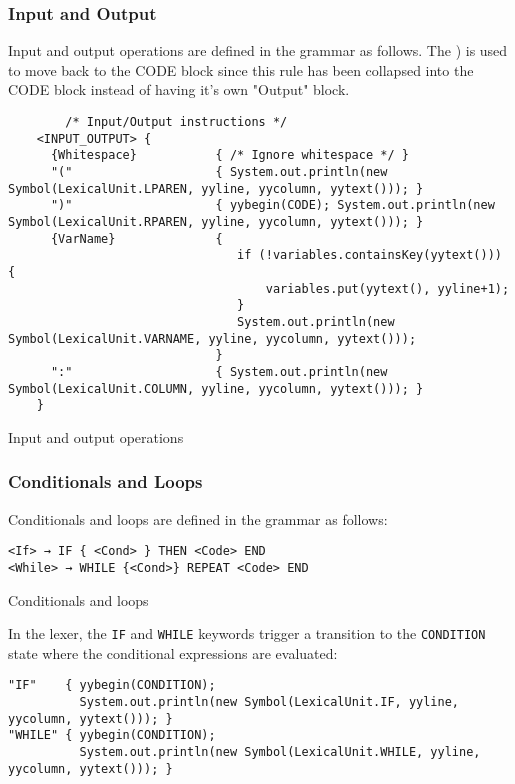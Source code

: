 	\subsubsection{Input and Output}
	Input and output operations are defined in the grammar as follows.
	The ) is used to move back to the CODE block since this rule has been collapsed into the CODE block instead of having it's own "Output" block.\\
	\begin{verbatim}
		/* Input/Output instructions */
	<INPUT_OUTPUT> {
	  {Whitespace}           { /* Ignore whitespace */ }
	  "("                    { System.out.println(new Symbol(LexicalUnit.LPAREN, yyline, yycolumn, yytext())); }
	  ")"                    { yybegin(CODE); System.out.println(new Symbol(LexicalUnit.RPAREN, yyline, yycolumn, yytext())); }
	  {VarName}              {
								if (!variables.containsKey(yytext())) {
									variables.put(yytext(), yyline+1);
								}
								System.out.println(new Symbol(LexicalUnit.VARNAME, yyline, yycolumn, yytext()));
							 }
	  ":"                    { System.out.println(new Symbol(LexicalUnit.COLUMN, yyline, yycolumn, yytext())); }
	}
	\end{verbatim}

    \begin{table}[h]
		\centering
		\caption{Input and output operations}
	\end{table}

	\subsubsection{Conditionals and Loops}
	Conditionals and loops are defined in the grammar as follows:

	\begin{verbatim}
<If> → IF { <Cond> } THEN <Code> END
<While> → WHILE {<Cond>} REPEAT <Code> END
	\end{verbatim}

    \begin{table}[h]
		\centering
		\caption{Conditionals and loops}
	\end{table}

	In the lexer, the \texttt{IF} and \texttt{WHILE} keywords trigger a transition to the \texttt{CONDITION} state where the conditional expressions are evaluated:

	\begin{verbatim}
"IF"    { yybegin(CONDITION);
          System.out.println(new Symbol(LexicalUnit.IF, yyline, yycolumn, yytext())); }
"WHILE" { yybegin(CONDITION);
          System.out.println(new Symbol(LexicalUnit.WHILE, yyline, yycolumn, yytext())); }
	\end{verbatim}

